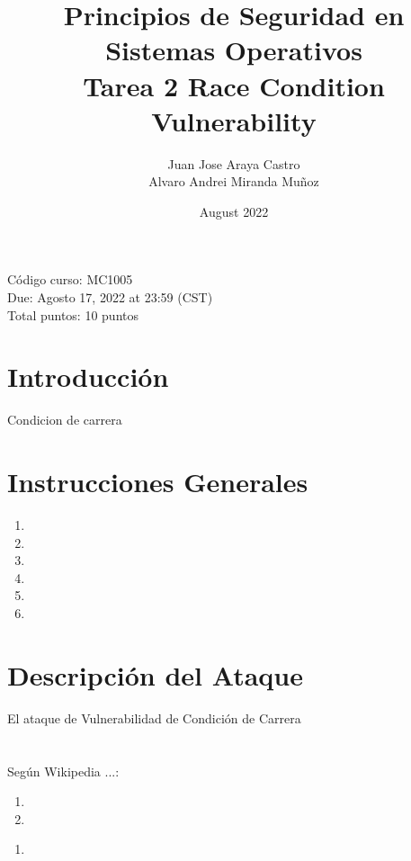 \documentclass{article}
\title{Principios de Seguridad en Sistemas Operativos \\ Tarea 2 Race Condition Vulnerability}
\author{Juan Jose Araya Castro \\
Alvaro Andrei Miranda Muñoz}
\date{August 2022}
\begin{document}
\maketitle

\begin{minipage}{\textwidth}
Código curso: MC1005\\
Due: Agosto 17, 2022 at 23:59 (CST)\\
Total puntos: 10 puntos\\
\end{minipage}
    
\section*{Introducción}
Condicion de carrera

\section*{Instrucciones Generales}

\begin{enumerate}
  \item 
  \item 
  \item 
  \item 
  \item 
  \item 
  
\end{enumerate}


\section*{Descripción del Ataque}

\tab El ataque de Vulnerabilidad de Condición de Carrera\\

\\
\\
Según Wikipedia ...:

\begin{enumerate}
  \item  
  \item 
\end{enumerate}

\begin{enumerate}

  \item 
  
\end{enumerate}
\end{document}
